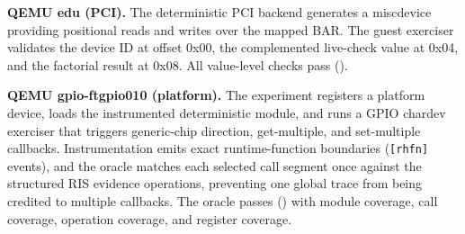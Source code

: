 \begin{table}[t]
\centering
\caption{Index of the LLM-side evidence studies. Each study's size,
outcome, and versioned record; records live under
\texttt{research/experiments/results/}.}
\label{tab:llm-studies}
\end{table}

\textbf{QEMU edu (PCI).} The deterministic PCI backend generates a
miscdevice providing positional reads and writes over the mapped BAR. The
guest exerciser validates the device ID at offset 0x00, the complemented
live-check value at 0x04, and the factorial result at 0x08. All value-level
checks pass (\texttt{\EduQEMUOracle}).

\textbf{QEMU gpio-ftgpio010 (platform).} The experiment registers a
platform device, loads the instrumented deterministic module, and runs a
GPIO chardev exerciser that triggers generic-chip direction, get-multiple,
and set-multiple callbacks. Instrumentation emits exact runtime-function
boundaries (\texttt{[rhfn]} events), and the oracle matches each selected
  call segment once against the structured RIS evidence operations, preventing
one global trace from being credited to multiple callbacks. The oracle
passes (\texttt{\FTQEMUOracle}) with \FTQEMUModuleCoverage{} module coverage,
\FTQEMUCallCoverage{} call coverage, \FTQEMUOpCoverage{} operation coverage,
and \FTQEMURegisterCoverage{} register coverage.

